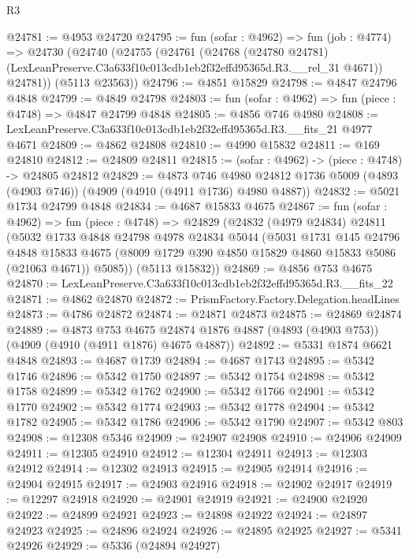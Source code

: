 \begin{lexlean}{R3}
\begin{coremodule}
@24781 := @4953 @24720
@24795 := fun (sofar : @4962) =>
  fun (job : @4774) =>
  @24730
    (@24740
      (@24755
        (@24761
          (@24768
            (@24780 @24781)
            (LexLeanPreserve.C3a633f10c013cdb1eb2f32effd95365d.R3.__rel_31 @4671))
          @24781))
      (@5113 @23563))
@24796 := @4851 @15829
@24798 := @4847 @24796 @4848
@24799 := @4849 @24798
@24803 := fun (sofar : @4962) => fun (piece : @4748) => @4847 @24799 @4848
@24805 := @4856 @746 @4980
@24808 := LexLeanPreserve.C3a633f10c013cdb1eb2f32effd95365d.R3.__fits_21 @4977 @4671
@24809 := @4862 @24808
@24810 := @4990 @15832
@24811 := @169 @24810
@24812 := @24809 @24811
@24815 := (sofar : @4962) -> (piece : @4748) -> @24805 @24812
@24829 := @4873
    @746
    @4980
    @24812
    @1736
    @5009
    (@4893 (@4903 @746))
    (@4909 (@4910 (@4911 @1736) @4980 @4887))
@24832 := @5021 @1734 @24799 @4848
@24834 := @4687 @15833 @4675
@24867 := fun (sofar : @4962) =>
  fun (piece : @4748) =>
  @24829
    (@24832
      (@4979 @24834)
      @24811
      (@5032
        @1733
        @4848
        @24798
        @4978
        @24834
        @5044
        (@5031
          @1731
          @145
          @24796
          @4848
          @15833
          @4675
          (@8009 @1729 @390 @4850 @15829 @4860 @15833 @5086 (@21063 @4671))
          @5085))
      (@5113 @15832))
@24869 := @4856 @753 @4675
@24870 := LexLeanPreserve.C3a633f10c013cdb1eb2f32effd95365d.R3.__fits_22
@24871 := @4862 @24870
@24872 := PrismFactory.Factory.Delegation.headLines
@24873 := @4786 @24872
@24874 := @24871 @24873
@24875 := @24869 @24874
@24889 := @4873
    @753
    @4675
    @24874
    @1876
    @4887
    (@4893 (@4903 @753))
    (@4909 (@4910 (@4911 @1876) @4675 @4887))
@24892 := @5331 @1874 @6621 @4848
@24893 := @4687 @1739
@24894 := @4687 @1743
@24895 := @5342 @1746
@24896 := @5342 @1750
@24897 := @5342 @1754
@24898 := @5342 @1758
@24899 := @5342 @1762
@24900 := @5342 @1766
@24901 := @5342 @1770
@24902 := @5342 @1774
@24903 := @5342 @1778
@24904 := @5342 @1782
@24905 := @5342 @1786
@24906 := @5342 @1790
@24907 := @5342 @803
@24908 := @12308 @5346
@24909 := @24907 @24908
@24910 := @24906 @24909
@24911 := @12305 @24910
@24912 := @12304 @24911
@24913 := @12303 @24912
@24914 := @12302 @24913
@24915 := @24905 @24914
@24916 := @24904 @24915
@24917 := @24903 @24916
@24918 := @24902 @24917
@24919 := @12297 @24918
@24920 := @24901 @24919
@24921 := @24900 @24920
@24922 := @24899 @24921
@24923 := @24898 @24922
@24924 := @24897 @24923
@24925 := @24896 @24924
@24926 := @24895 @24925
@24927 := @5341 @24926
@24929 := @5336 (@24894 @24927)

\end{coremodule}
\end{lexlean}
